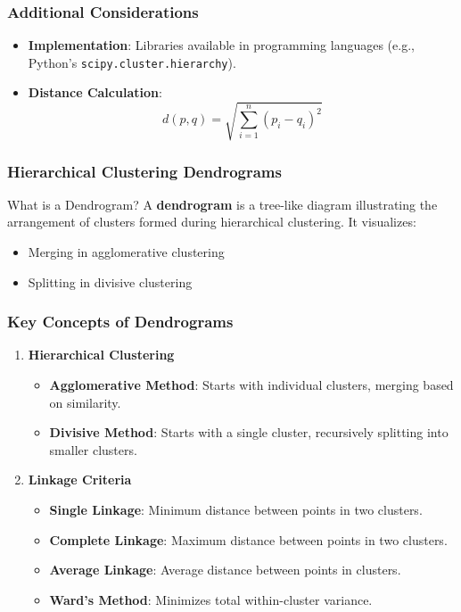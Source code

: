 \documentclass[aspectratio=169]{beamer}
\begin{document}
\begin{frame}[fragile]
    \frametitle{Additional Considerations}
    \begin{itemize}
        \item \textbf{Implementation}: Libraries available in programming languages (e.g., Python's \texttt{scipy.cluster.hierarchy}).
        \item \textbf{Distance Calculation}:
        \begin{equation}
            d(p, q) = \sqrt{\sum_{i=1}^{n}(p_i - q_i)^2}
        \end{equation}
    \end{itemize}
\end{frame}

\begin{frame}
    \frametitle{Hierarchical Clustering Dendrograms}
    \begin{block}{What is a Dendrogram?}
        A \textbf{dendrogram} is a tree-like diagram illustrating the arrangement of clusters formed during hierarchical clustering. It visualizes:
        \begin{itemize}
            \item Merging in agglomerative clustering
            \item Splitting in divisive clustering
        \end{itemize}
    \end{block}
\end{frame}

\begin{frame}
    \frametitle{Key Concepts of Dendrograms}
    \begin{enumerate}
        \item \textbf{Hierarchical Clustering}
        \begin{itemize}
            \item \textbf{Agglomerative Method}: Starts with individual clusters, merging based on similarity.
            \item \textbf{Divisive Method}: Starts with a single cluster, recursively splitting into smaller clusters.
        \end{itemize}
        
        \item \textbf{Linkage Criteria}
        \begin{itemize}
            \item \textbf{Single Linkage}: Minimum distance between points in two clusters.
            \item \textbf{Complete Linkage}: Maximum distance between points in two clusters.
            \item \textbf{Average Linkage}: Average distance between points in clusters.
            \item \textbf{Ward's Method}: Minimizes total within-cluster variance.
        \end{itemize}
    \end{enumerate}
\end{frame}
\end{document}
